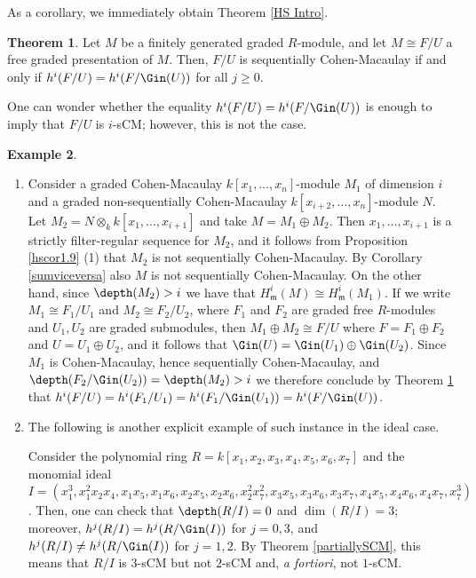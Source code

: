 \documentclass[12pt]{amsart}
\newcommand{\eee}[1]{{\color{blue} \sf $\clubsuit\clubsuit\clubsuit$ [#1]}}
\newcommand{\ooo}[1]{{\color{red} \sf $\clubsuit\clubsuit\clubsuit$ [#1]}}
\theoremstyle{definition}
\newtheorem{theorem}{Theorem}[section]
\theoremstyle{definition}
\newtheorem{example}[theorem]{Example}
\newcommand{\m}{\mathfrak{m}}
\renewcommand{\geq}{\geqslant}
\begin{document}
As a corollary, we immediately obtain Theorem \ref{HS Intro}.

\begin{theorem}\label{HeSb}
Let $M$ be a finitely generated graded $R$-module, and let $M \cong F/U$ a free graded presentation of $M$. Then, $F/U$ is sequentially Cohen-Macaulay if and only if $h^i(F/U)=h^i(F/\Gin(U))$ for all $j \geq 0$. 
\end{theorem}


\noindent
One can  wonder whether the equality $h^i(F/U)=h^i(F/\Gin(U))$ is enough to imply that $F/U$ is $i$-sCM; however, this is not the case.

\begin{example}\label{giuliospezza} %
\begin{enumerate}[(1)]
\item Consider a graded Cohen-Macaulay $k[x_1,\dots,x_n]$-module $M_1$ of dimension $i$  and a graded non-sequentially Cohen-Macaulay $k[x_{i+2},\dots,x_n]$-module $N$. Let $M_2=N\otimes_k k[x_1,\ldots,x_{i+1}]$ and take $M=M_1 \oplus M_2$. Then $x_1,\ldots,x_{i+1}$ is a strictly filter-regular sequence for $M_2$, and it follows from Proposition \ref{hscor1.9} (1) that $M_2$ is not sequentially Cohen-Macaulay. By Corollary \ref{sumviceversa} also $M$ is not sequentially Cohen-Macaulay. On the other hand, since $\depth(M_2) > i$ we have that $H^i_\m(M) \cong H^i_\m(M_1)$. If we write $M_1 \cong F_1/U_1$ and $M_2 \cong F_2/U_2$, where $F_1$ and $F_2$ are graded free $R$-modules and $U_1,U_2$ are graded submodules, then $M_1 \oplus M_2 \cong F/U$ where $F=F_1 \oplus F_2$ and $U = U_1 \oplus U_2$, and it follows that $\Gin(U) = \Gin(U_1) \oplus \Gin(U_2)$. Since $M_1$ is Cohen-Macaulay, hence sequentially Cohen-Macaulay, and $\depth(F_2/\Gin(U_2)) = \depth(M_2)>i$ we therefore conclude by Theorem \ref{HeSb} that $h^i(F/U) = h^i(F_1/U_1) = h^i(F_1/\Gin(U_1)) = h^i(F/\Gin(U))$. %
\item  The following is another explicit example of such instance in the ideal case.
  
\noindent Consider the polynomial ring  $R=k[x_1,x_2,x_3,x_4,x_5,x_6,x_7]$ and the monomial ideal $I=(x_1^3, x_1^2 x_2 x_4, x_1x_5, x_1x_6, x_2x_5, x_2x_6, x_2^2 x_7^2, x_3x_5, x_3x_6, x_3x_7, x_4x_5, x_4 x_6, x_4 x_7 , x_7^3)$. Then, one can check that $\depth(R/I)=0$ and $\dim(R/I)=3$; moreover,  $h^j(R/I)=h^j(R/\Gin(I))$ for $j=0,3$, and   $h^j(R/I)\neq h^j(R/\Gin(I))$ for $j=1,2$. By Theorem \ref{partiallySCM}, this means that $R/I$ is $3$-sCM but not $2$-sCM and, {\em a fortiori}, not $1$-sCM.
\end{enumerate}
\end{example}
\end{document}
